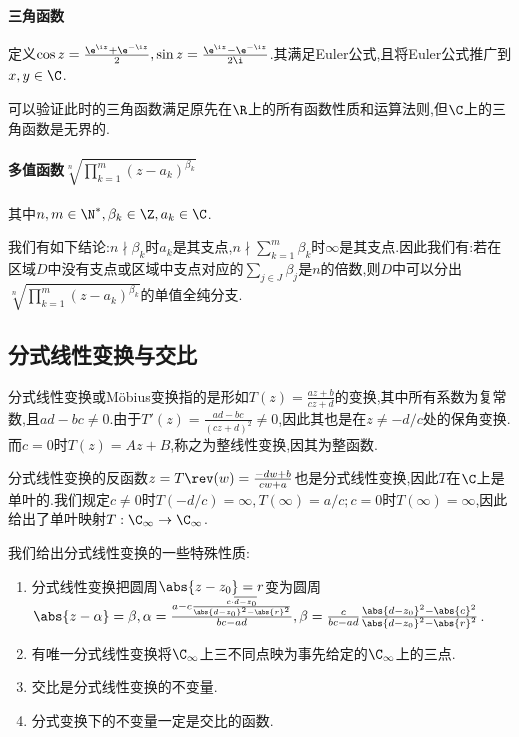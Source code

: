\documentclass{article}
\begin{document}
\paragraph{三角函数}定义$\cos z=\frac{\e^{\i z}+\e^{-\i z}}{2},\sin z=\frac{\e^{\i z}-\e^{-\i z}}{2\i}$.其满足Euler公式,且将Euler公式推广到$x,y\in \C$.

可以验证此时的三角函数满足原先在$\R$上的所有函数性质和运算法则,但$\C$上的三角函数是无界的.

\paragraph{多值函数$\sqrt[n]{\prod_{k=1}^{m}(z-a_k)^{\beta_k}}$}其中$n,m\in \N^*, \beta_k\in \Z,a_k\in \C$.

我们有如下结论:$n\nmid\beta_k$时$a_k$是其支点,$n\nmid\sum_{k=1}^m\beta_k$时$\infty$是其支点.因此我们有:若在区域$D$中没有支点或区域中支点对应的$\sum_{j\in J}\beta_j$是$n$的倍数,则$D$中可以分出$\sqrt[n]{\prod_{k=1}^{m}(z-a_k)^{\beta_k}}$的单值全纯分支.

\subsection{分式线性变换与交比}分式线性变换或M\"{o}bius变换指的是形如$T(z)=\frac{az+b}{cz+d}$的变换,其中所有系数为复常数,且$ad-bc\neq 0$.由于$T'(z)=\frac{ad-bc}{(cz+d)^2}\neq 0$,因此其也是在$z\neq -d/c$处的保角变换.而$c=0$时$T(z)=Az+B$,称之为整线性变换,因其为整函数.

分式线性变换的反函数$z=T\rev(w)=\frac{-dw+b}{cw+a}$也是分式线性变换,因此$T$在$\C$上是单叶的.我们规定$c\neq 0$时$T(-d/c)=\infty,T(\infty)=a/c;c=0$时$T(\infty)=\infty$,因此给出了单叶映射$T:\C_\infty\to \C_\infty$.

我们给出分式线性变换的一些特殊性质:
\begin{enumerate}
    \item 分式线性变换把圆周$\abs{z-z_0}=r$变为圆周$\abs{z-\alpha}=\beta, \alpha=\frac{a-c\frac{c\cdot\overline{d-z_0}}{\abs{d-z_0}^2-\abs{r}^2}}{bc-ad},\beta=\frac{c}{bc-ad}\frac{\abs{d-z_0}^2-\abs{c}^2}{\abs{d-z_0}^2-\abs{r}^2}$.
    \item 有唯一分式线性变换将$\C_\infty$上三不同点映为事先给定的$\C_\infty$上的三点.\\
    \item 交比是分式线性变换的不变量.
    \item 分式变换下的不变量一定是交比的函数.
\end{enumerate}
\end{document}
